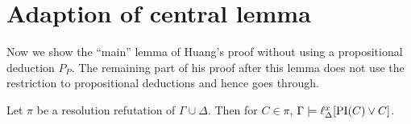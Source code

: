 \section{Adaption of central lemma}

Now we show the ``main'' lemma of Huang's proof without using a propositional deduction $P_P$.
The remaining part of his proof after this lemma does not use the restriction to propositional deductions and hence goes through.

\begin{lemma}
	Let $\pi$ be a resolution refutation of $\Gamma \cup \Delta$.
	Then for $C \in \pi$,
	$ \Gamma \models \ell_{\Delta}^{x}[\operatorname{PI}(C) \lor C] $.
	\label{lemma:gamma_entails_interpolant}
\end{lemma}

